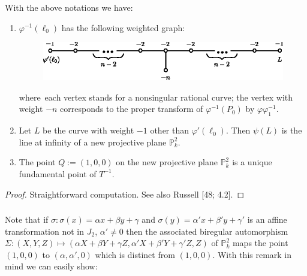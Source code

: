 \subsubsection{}\label{chap2:3.4.1}
\begin{lemma*}
  With the above notations we have:
  \begin{enumerate}
    \renewcommand{\labelenumi}{\rm(\theenumi)}
  \item $\varphi^{-1}(\ell_{0})$ has the following weighted graph:
    \begin{figure}[H]
      \centering
      \includegraphics{figures/chap2-fig6.eps}
    \end{figure}
    where\pageoriginale\ each vertex stands for a nonsingular rational
    curve; the vertex with weight $-n$ corresponds to the proper transform
    of $\varphi^{-1}(P_{0})$ by $\varphi\varphi^{-1}_{1}$.
    
  \item Let $L$ be the curve with weight $-1$ other than
    $\varphi'(\ell_{0})$. Then $\psi(L)$ is the line at infinity of a
    new projective plane $\mathbb{P}^{2}_{k}$.
    
  \item The point $Q:=(1,0,0)$ on the new projective plane
    $\mathbb{P}^{2}_{k}$ is a unique fundamental point of $T^{-1}$.
  \end{enumerate}
\end{lemma*}

\begin{proof}
Straightforward computation. See also Russell [48; 4.2].
\end{proof}

\subsubsection{}\label{chap2:3.4.2}
Note that if $\sigma:\sigma(x)=\alpha x+\beta y+\gamma$ and
$\sigma(y)=\alpha'x+\beta'y+\gamma'$ is an affine transformation not
in $J_{2}$, \iec $\alpha'\neq 0$ then the associated biregular
automorphism $\Sigma:(X,Y,Z)\mapsto (\alpha X+\beta Y+\gamma
Z,\alpha'X+\beta'Y+\gamma'Z,Z)$ of $\mathbb{P}^{2}_{k}$ maps the point
$(1,0,0)$ to $(\alpha,\alpha',0)$ which is distinct from
$(1,0,0)$. With this remark in mind we can easily show:


